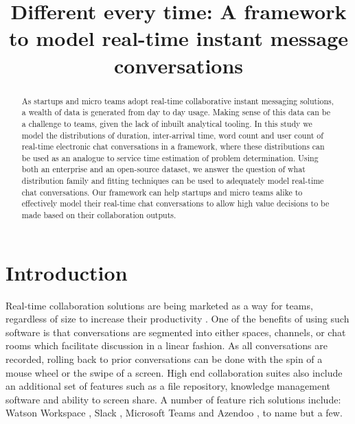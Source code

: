 \documentclass[conference]{IEEEtran}
\begin{document}
\title{Different every time: A framework to model real-time instant message conversations}
\date{}%

\author{
\and
{}
}\maketitle

\begin{abstract}
As startups and micro teams adopt real-time collaborative instant messaging solutions, a wealth of data is generated from day to day usage. Making sense of this data can be a challenge to teams, given the lack of inbuilt analytical tooling. In this study we model the distributions of duration, inter-arrival time, word count and user count of real-time electronic chat conversations in a framework, where these distributions can be used as an analogue to service time estimation of problem determination. Using both an enterprise and an open-source dataset, we answer the question of what distribution family and fitting techniques can be used to adequately model real-time chat conversations. Our framework can help startups and micro teams alike to effectively model their real-time chat conversations to allow high value decisions to be made based on their collaboration outputs.
\end{abstract}

\section{Introduction}

Real-time collaboration solutions are being marketed as a way for teams, regardless of size to increase their productivity \cite{SmartCollab} \cite{eightbiz} \cite{slackSME}. One of the benefits of using such software is that conversations are segmented into either spaces, channels, or chat rooms which facilitate discussion in a linear fashion. As all conversations are recorded, rolling back to prior conversations can be done with the spin of a mouse wheel or the swipe of a screen. High end collaboration suites also include an additional set of features such as a file repository, knowledge management software and ability to screen share.  A number of feature rich solutions include: Watson Workspace \cite{WatWork}, Slack \cite{Slack}, Microsoft Teams \cite{MSTeams} and Azendoo \cite{Azendo}, to name but a few.  
\end{document}
